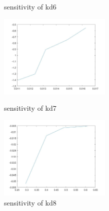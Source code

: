 \begin{figure}
\begin{varwidth}[t]{\textwidth}
	\end{varwidth}
	\caption{sensitivity of kd6}
	\begin{varwidth}[t]{\textwidth}
		\vspace{0pt}
		\includegraphics[height=4cm]{sd7.jpg}
	\end{varwidth}
	\caption{sensitivity of kd7}
	\begin{varwidth}[t]{\textwidth}
		\vspace{0pt}
		\includegraphics[height=4cm]{sd8.jpg}
	\end{varwidth}
	\caption{sensitivity of kd8}
\end{figure}


